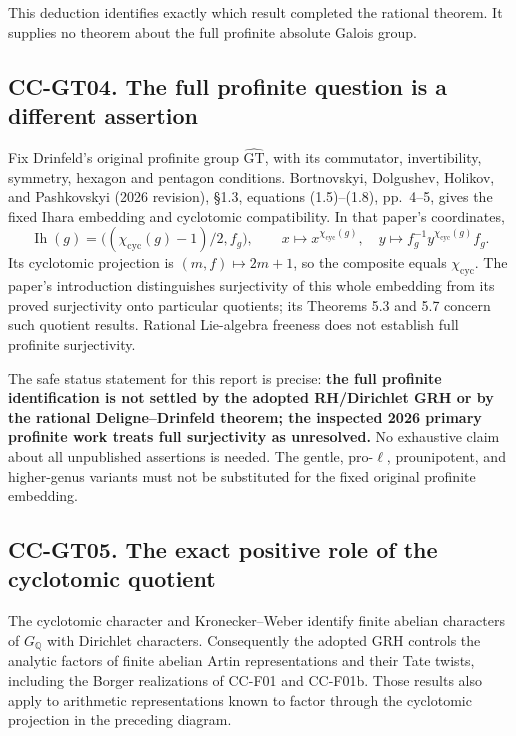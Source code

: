 \documentclass[11pt,a4paper]{article}
\theoremstyle{definition}\newtheorem{definition}[theorem]{Definition}
\theoremstyle{remark}\newtheorem{remark}[theorem]{Remark}
\begin{document}
This deduction identifies exactly which result completed the rational
theorem. It supplies no theorem about the full profinite absolute Galois
group.

\subsection{CC-GT04. The full profinite question is a different
assertion}\label{cc-gt04.-the-full-profinite-question-is-a-different-assertion}

Fix Drinfeld's original profinite group \(\widehat{\mathrm{GT}}\), with
its commutator, invertibility, symmetry, hexagon and pentagon
conditions. Bortnovskyi, Dolgushev, Holikov, and Pashkovskyi (2026
revision), §1.3, equations (1.5)--(1.8), pp.~4--5, gives the fixed Ihara
embedding and cyclotomic compatibility. In that paper's coordinates, \[
 \operatorname{Ih}(g)=\bigl((\chi_{\mathrm{cyc}}(g)-1)/2,f_g\bigr),
 \qquad
 x\mapsto x^{\chi_{\mathrm{cyc}}(g)},\quad
 y\mapsto f_g^{-1}y^{\chi_{\mathrm{cyc}}(g)}f_g.
\] Its cyclotomic projection is \((m,f)\mapsto2m+1\), so the composite
equals \(\chi_{\mathrm{cyc}}\). The paper's introduction distinguishes
surjectivity of this whole embedding from its proved surjectivity onto
particular quotients; its Theorems 5.3 and 5.7 concern such quotient
results. Rational Lie-algebra freeness does not establish full profinite
surjectivity.

The safe status statement for this report is precise: \textbf{the full
profinite identification is not settled by the adopted RH/Dirichlet GRH
or by the rational Deligne--Drinfeld theorem; the inspected 2026 primary
profinite work treats full surjectivity as unresolved.} No exhaustive
claim about all unpublished assertions is needed. The gentle,
pro-\(\ell\), prounipotent, and higher-genus variants must not be
substituted for the fixed original profinite embedding.

\subsection{CC-GT05. The exact positive role of the cyclotomic
quotient}\label{cc-gt05.-the-exact-positive-role-of-the-cyclotomic-quotient}

The cyclotomic character and Kronecker--Weber identify finite abelian
characters of \(G_{\mathbb Q}\) with Dirichlet characters. Consequently
the adopted GRH controls the analytic factors of finite abelian Artin
representations and their Tate twists, including the Borger realizations
of CC-F01 and CC-F01b. Those results also apply to arithmetic
representations known to factor through the cyclotomic projection in the
preceding diagram.
\end{document}
